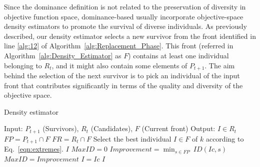 Since the dominance definition is not related to the preservation of diversity in objective function space,
dominance-based \MOEAS{} usually incorporate objective-space density estimators to promote the survival
of diverse individuals.
%
As previously described, our density estimator selects a new survivor from the front identified
in line \ref{alg:12} of Algorithm~\ref{alg:Replacement_Phase}.
%
This front (referred in Algorithm~\ref{alg:Density_Estimator} as $F$) contains at least one 
individual belonging to $R_t$, and it might also contain some elements 
of $P_{t+1}$.
%
The aim behind the selection of the next survivor is to pick an individual of the input front
that contributes significantly in terms of the quality and diversity of the objective space. %
\begin{algorithm}[t]
	\caption{Density estimator} 
\begin{small}
\begin{algorithmic}[1]
\STATE Input: $P_{t+1}$ (Survivors), $R_t$ (Candidates), $F$ (Current front)
    	\STATE Output: $I \in R_t$ 
	\STATE $FP = P_{t+1} \cap F$ \label{alg:FP}
	\STATE $FR = R_{t} \cap F$ \label{alg:FR}
        \label{alg:density_for}
	      \STATE Select the best individual $I \in F$ of $k$ according to Eq.~\ref{eqn:extremes}.\label{alg:density_1}
	  	 \RETURN $I$ \label{alg:density_2}
	  	\ENDIF
	\ENDFOR\label{alg:density_endfor}
	\STATE $MaxID = 0$ \label{alg:density_for2}
	\STATE $Improvement = \displaystyle{\min_{s \in FP}\ ID(Ic, s)}$ 
	 \label{alg:density_if2}
	   \STATE $MaxID = Improvement$
	   \STATE $I = Ic$ 
	\ENDIF \label{alg:density_endif2}
	\ENDFOR	\label{alg:density_endfor2}
    	\RETURN $I$ \label{alg:density_4}
	\end{algorithmic}
\end{small}
\label{alg:Density_Estimator}
\end{algorithm}

